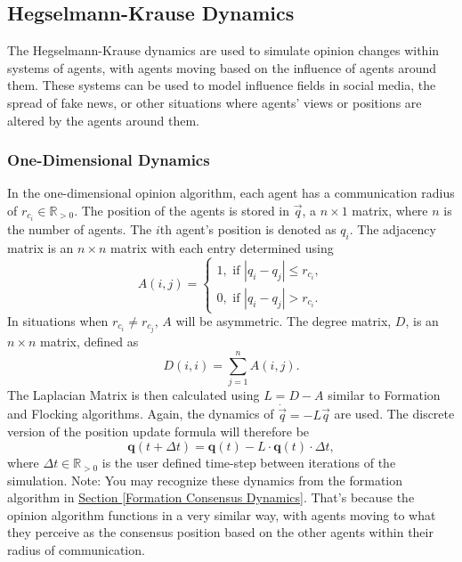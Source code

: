 \documentclass[../CourseManual.tex]{subfiles}
\begin{document}
\subsection{Hegselmann-Krause Dynamics} \label{H-K Dynamics}
The Hegselmann-Krause dynamics are used to simulate opinion changes within systems of agents, with agents moving based on the influence of agents around them. These systems can be used to model influence fields in social media, the spread of fake news, or other situations where agents’ views or positions are altered by the agents around them.

\subsubsection{One-Dimensional Dynamics} \label{One-Dimensional Dynamics}
In the one-dimensional opinion algorithm, each agent has a communication radius of $r_{c_i} \in \mathbb{R}_{>0}$. The position of the agents is stored in $\vec{q}$, a $n \times 1$ matrix, where $n$ is the number of agents. The $i$th agent's position is denoted as $q_i$. The adjacency matrix is an $n \times n$ matrix with each entry determined using
\[
A(i,j) = 
\begin{cases}
1, \text{ if } |q_i - q_j| \leq r_{c_i}, \\
0, \text{ if } |q_i - q_j| > r_{c_i}.
\end{cases}
\]
In situations when $r_{c_i} \neq r_{c_j}$, $A$ will be asymmetric. The degree matrix, $D$, is an $n \times n$ matrix, defined as
\[
D(i,i) = \sum_{j=1}^{n}{A(i,j).}
\]
The Laplacian Matrix is then calculated using $L = D - A$ similar to Formation and Flocking algorithms. Again, the dynamics of $\dot{\vec{q}} = -L\vec{q}$ are used. The discrete version of the position update formula will therefore be
\[
\boldsymbol{q}(t+\Delta t) = \boldsymbol{q}(t) - L \cdot \boldsymbol{q}(t) \cdot \Delta t,
\]
where $\Delta t \in \mathbb{R}_{>0}$ is the user defined time-step between iterations of the simulation. Note: You may recognize these dynamics from the formation algorithm in \hyperref[Formation Consensus Dynamics]{Section \ref{Formation Consensus Dynamics}}. That’s because the opinion algorithm functions in a very similar way, with agents moving to what they perceive as the consensus position based on the other agents within their radius of communication.
\end{document}
